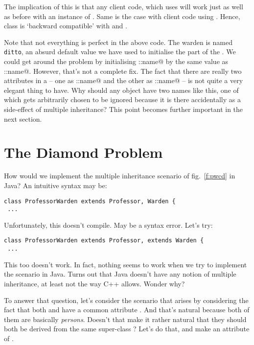 \documentclass[12pt,a4paper]{article}
\begin{document}
The implication of this is that any client code, which uses \lstinline@Professor@ will work just as well as before with an instance of \lstinline@ProfessorWarden@. Same is the case with client code using \lstinline@Warden@. Hence, \lstinline@ProfessorWarden@ class is `backward compatible' with \lstinline@Professor@ and \lstinline@Warden@.

Note that not everything is perfect in the above code. The warden is named \texttt{ditto}, an absurd default value we have used to initialise the \lstinline@Warden@ part of the \lstinline@ProfessorWarden@. We could get around the problem by initialising \lstinline@Warden::name@ by the same value as \lstinline@Professor::name@. However, that's not a complete fix. The fact that there are really two \lstinline@name@ attributes in a \lstinline@ProfessorWarden@ -- one as \lstinline@Warden::name@ and the other as \lstinline@Professor::name@ -- is not quite a very elegant thing to have. Why should any object have two names like this, one of which gets arbitrarily chosen to be ignored because it is there accidentally as a side-effect of multiple inheritance? This point becomes further important in the next section.

\section{The Diamond Problem}
How would we implement the multiple inheritance scenario  of fig.~\ref{f:pwcd} in Java? An intuitive syntax may be:
\begin{lstlisting}[frame=single]
class ProfessorWarden extends Professor, Warden {
 ...
\end{lstlisting}

Unfortunately, this doesn't compile. May be a syntax error. Let's try:
\begin{lstlisting}[frame=single]
class ProfessorWarden extends Professor, extends Warden {
 ...
\end{lstlisting}

This too doesn't work. In fact, nothing seems to work when we try to implement the scenario in Java. Turns out that Java doesn't have any notion of multiple inheritance, at least not the way C++ allows. Wonder why?

To answer that question, let's consider the scenario that arises by considering the fact that both \lstinline@Professor@ and \lstinline@Warden@ have a common attribute \lstinline@name@. And that's natural because both of them are basically \emph{persons}. Doesn't that make it rather natural that they should both be derived from the same super-class \lstinline@Person@? Let's do that, and make \lstinline@name@ an attribute of \lstinline@Person@.
\end{document}
